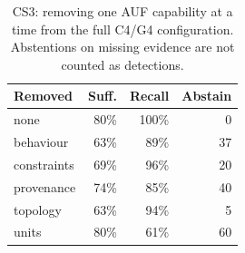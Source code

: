 \begin{table}[t]
\centering\footnotesize
\setlength{\tabcolsep}{3pt}
\caption{CS3: removing one AUF capability at a time from the full C4/G4 configuration. Abstentions on missing evidence are not counted as detections.}
\label{tab:cs3}
\begin{tabular}{@{}lrrr@{}}
\toprule
Removed & Suff. & Recall & Abstain \\
\midrule
none & 80\% & 100\% & 0 \\
behaviour & 63\% & 89\% & 37 \\
constraints & 69\% & 96\% & 20 \\
provenance & 74\% & 85\% & 40 \\
topology & 63\% & 94\% & 5 \\
units & 80\% & 61\% & 60 \\
\bottomrule
\end{tabular}
\end{table}
